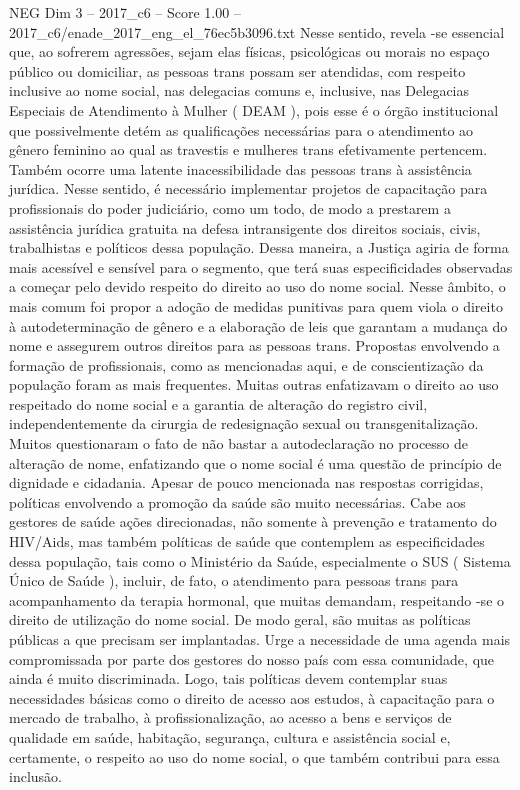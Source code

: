 \begin{textsample}{NEG Dim 3 – 2017\_c6 – Score 1.00 – 2017\_c6/enade\_2017\_eng\_el\_76ec5b3096.txt}
Nesse sentido, revela -se essencial que, ao sofrerem agressões, sejam elas físicas, psicológicas ou morais no espaço público ou domiciliar, as pessoas trans possam ser atendidas, com respeito inclusive ao nome social, nas delegacias comuns e, inclusive, nas Delegacias Especiais de Atendimento à Mulher ( DEAM ), pois esse é o órgão institucional que possivelmente detém as qualificações necessárias para o atendimento ao gênero feminino ao qual as travestis e mulheres trans efetivamente pertencem.
Também ocorre uma latente inacessibilidade das pessoas trans à assistência jurídica.
Nesse sentido, é necessário implementar projetos de capacitação para profissionais do poder judiciário, como um todo, de modo a prestarem a assistência jurídica gratuita na defesa intransigente dos direitos sociais, civis, trabalhistas e políticos dessa população.
Dessa maneira, a Justiça agiria de forma mais acessível e sensível para o segmento, que terá suas especificidades observadas a começar pelo devido respeito do direito ao uso do nome social.
Nesse âmbito, o mais comum foi propor a adoção de medidas punitivas para quem viola o direito à autodeterminação de gênero e a elaboração de leis que garantam a mudança do nome e assegurem outros direitos para as pessoas trans.
Propostas envolvendo a formação de profissionais, como as mencionadas aqui, e de conscientização da população foram as mais frequentes.
Muitas outras enfatizavam o direito ao uso respeitado do nome social e a garantia de alteração do registro civil, independentemente da cirurgia de redesignação sexual ou transgenitalização.
Muitos questionaram o fato de não bastar a autodeclaração no processo de alteração de nome, enfatizando que o nome social é uma questão de princípio de dignidade e cidadania.
Apesar de pouco mencionada nas respostas corrigidas, políticas envolvendo a promoção da saúde são muito necessárias.
Cabe aos gestores de saúde ações direcionadas, não somente à prevenção e tratamento do HIV/Aids, mas também políticas de saúde que contemplem as especificidades dessa população, tais como o Ministério da Saúde, especialmente o SUS ( Sistema Único de Saúde ), incluir, de fato, o atendimento para pessoas trans para acompanhamento da terapia hormonal, que muitas demandam, respeitando -se o direito de utilização do nome social.
De modo geral, são muitas as políticas públicas a que precisam ser implantadas.
Urge a necessidade de uma agenda mais compromissada por parte dos gestores do nosso país com essa comunidade, que ainda é muito discriminada.
Logo, tais políticas devem contemplar suas necessidades básicas como o direito de acesso aos estudos, à capacitação para o mercado de trabalho, à profissionalização, ao acesso a bens e serviços de qualidade em saúde, habitação, segurança, cultura e assistência social e, certamente, o respeito ao uso do nome social, o que também contribui para essa inclusão.

\end{textsample}
